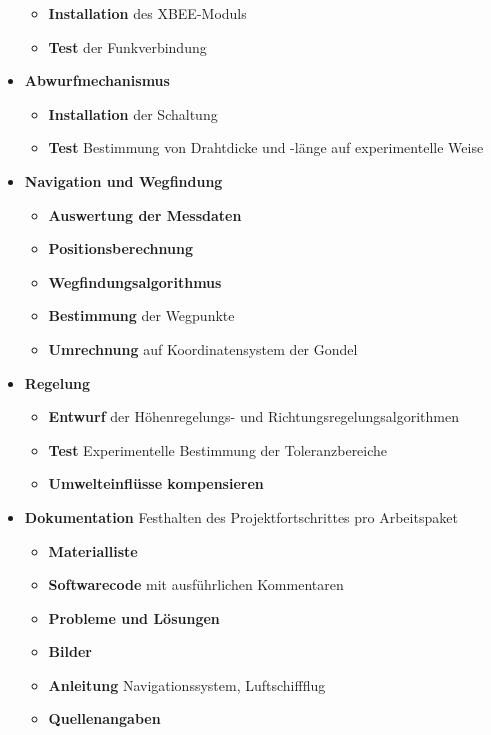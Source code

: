 \documentclass[lang=ngerman,inputenc=utf8,fontsize=10pt]{ldvarticle}
\begin{document}
\begin{itemize}
\begin{itemize}
			\item \textbf{Installation} des XBEE-Moduls
			\item \textbf{Test} der Funkverbindung
		\end{itemize}
		
	\item \textbf{Abwurfmechanismus}
		\begin{itemize}
			\item \textbf{Installation} der Schaltung
			\item \textbf{Test} Bestimmung von Drahtdicke und -länge auf experimentelle Weise
		\end{itemize}

	\item \textbf{Navigation und Wegfindung}  
		\begin{itemize}
			\item \textbf{Auswertung der Messdaten}
			\item \textbf{Positionsberechnung}
			\item \textbf{Wegfindungsalgorithmus}
			\item \textbf{Bestimmung} der Wegpunkte
			\item \textbf{Umrechnung} auf Koordinatensystem der Gondel
			
		\end{itemize}
		
	\item \textbf{Regelung}  
		\begin{itemize}
			\item \textbf{Entwurf} der Höhenregelungs- und Richtungsregelungsalgorithmen
			\item \textbf{Test} Experimentelle Bestimmung der Toleranzbereiche
			\item \textbf{Umwelteinflüsse kompensieren}
		\end{itemize}
	
	\item \textbf{Dokumentation} Festhalten des Projektfortschrittes pro Arbeitspaket
		\begin{itemize}
			\item \textbf{Materialliste}
			\item \textbf{Softwarecode} mit ausführlichen Kommentaren
			\item \textbf{Probleme und Lösungen}
			\item \textbf{Bilder}
			\item \textbf{Anleitung} Navigationssystem, Luftschiffflug
			\item \textbf{Quellenangaben}
		\end{itemize}
\end{itemize}
\end{document}
